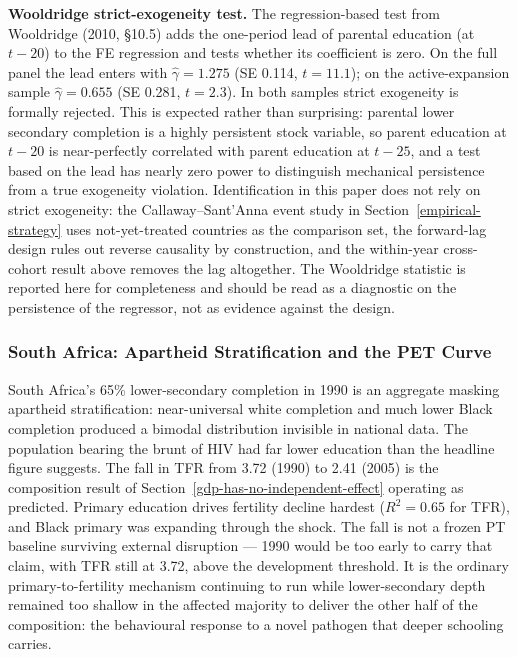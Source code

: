 \documentclass[12pt,letterpaper]{article}
\begin{document}
{\textbf{Wooldridge strict-exogeneity test.} The regression-based
test from Wooldridge (2010, §10.5) adds the one-period lead of parental
education (at $t-20$) to the FE regression and tests whether its
coefficient is zero. On the full panel the lead enters with
$\hat\gamma=1.275$ (SE 0.114, $t=11.1$); on the active-expansion sample
$\hat\gamma=0.655$ (SE 0.281, $t=2.3$). In both samples strict exogeneity
is formally rejected. This is expected rather than surprising: parental
lower secondary completion is a highly persistent stock variable, so
parent education at $t-20$ is near-perfectly correlated with parent
education at $t-25$, and a test based on the lead has nearly zero
power to distinguish mechanical persistence from a true exogeneity
violation. Identification in this paper does not rely on strict
exogeneity: the Callaway--Sant'Anna event study in
Section~\ref{empirical-strategy} uses not-yet-treated countries as the
comparison set, the forward-lag design rules out reverse causality by
construction, and the within-year cross-cohort result above removes the
lag altogether. The Wooldridge statistic is reported here for
completeness and should be read as a diagnostic on the persistence of
the regressor, not as evidence against the design.

\subsubsection{South Africa: Apartheid Stratification and the PET Curve}\label{appendix-south-africa}

South Africa's 65\% lower-secondary completion in 1990 is an aggregate
masking apartheid stratification: near-universal white completion and
much lower Black completion produced a bimodal distribution invisible
in national data. The population bearing the brunt of HIV had far
lower education than the headline figure suggests. The fall in TFR
from 3.72 (1990) to 2.41 (2005) is the composition result of
Section~\ref{gdp-has-no-independent-effect} operating as predicted.
Primary education drives fertility decline hardest ($R^2=0.65$ for
TFR), and Black primary was expanding through the shock. The fall is
not a frozen PT baseline surviving external disruption --- 1990 would
be too early to carry that claim, with TFR still at 3.72, above the
development threshold. It is the ordinary primary-to-fertility
mechanism continuing to run while lower-secondary depth remained too
shallow in the affected majority to deliver the other half of the
composition: the behavioural response to a novel pathogen that deeper
schooling carries.

}
\end{document}
